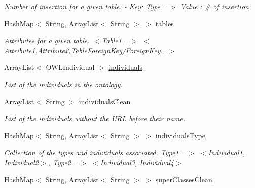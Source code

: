 \begin{DoxyCompactItemize}
\begin{DoxyCompactList}\small\item\em Number of insertion for a given table.  -\/ Key: Type =$>$ Value : \# of insertion. \end{DoxyCompactList}\item 
\hypertarget{class_data_base_1_1_individuals_ae6a515b85461d50ad21ac1051c5133b1}{
HashMap$<$ String, ArrayList$<$ String $>$ $>$ \hyperlink{class_data_base_1_1_individuals_ae6a515b85461d50ad21ac1051c5133b1}{tables}}
\label{class_data_base_1_1_individuals_ae6a515b85461d50ad21ac1051c5133b1}

\begin{DoxyCompactList}\small\item\em Attributes for a given table.  $<$Table1 =$>$ $<$Attribute1,Attribute2,TableForeignKey/ForeignKey...$>$ \end{DoxyCompactList}\item 
\hypertarget{class_data_base_1_1_individuals_a08ea25eeecb245fe06a36c95be656b3f}{
ArrayList$<$ OWLIndividual $>$ \hyperlink{class_data_base_1_1_individuals_a08ea25eeecb245fe06a36c95be656b3f}{individuals}}
\label{class_data_base_1_1_individuals_a08ea25eeecb245fe06a36c95be656b3f}

\begin{DoxyCompactList}\small\item\em List of the individuals in the ontology. \end{DoxyCompactList}\item 
\hypertarget{class_data_base_1_1_individuals_ae24686ef4531cd049c7a673911388cab}{
ArrayList$<$ String $>$ \hyperlink{class_data_base_1_1_individuals_ae24686ef4531cd049c7a673911388cab}{individualsClean}}
\label{class_data_base_1_1_individuals_ae24686ef4531cd049c7a673911388cab}

\begin{DoxyCompactList}\small\item\em List of the individuals without the URL before their name. \end{DoxyCompactList}\item 
\hypertarget{class_data_base_1_1_individuals_aca4c53086ef19d23f9d76616f5b67d63}{
HashMap$<$ String, ArrayList$<$ String $>$ $>$ \hyperlink{class_data_base_1_1_individuals_aca4c53086ef19d23f9d76616f5b67d63}{individualsType}}
\label{class_data_base_1_1_individuals_aca4c53086ef19d23f9d76616f5b67d63}

\begin{DoxyCompactList}\small\item\em Collection of the types and individuals associated.  Type1 =$>$ $<$Individual1, Individual2$>$, Type2 =$>$ $<$Individual3, Individual4$>$ \end{DoxyCompactList}\item 
\hypertarget{class_data_base_1_1_individuals_ab96b206dfc1f13a8b96512de40215643}{
HashMap$<$ String, ArrayList$<$ String $>$ $>$ \hyperlink{class_data_base_1_1_individuals_ab96b206dfc1f13a8b96512de40215643}{superClassesClean}}
\label{class_data_base_1_1_individuals_ab96b206dfc1f13a8b96512de40215643}


\end{DoxyCompactItemize}
